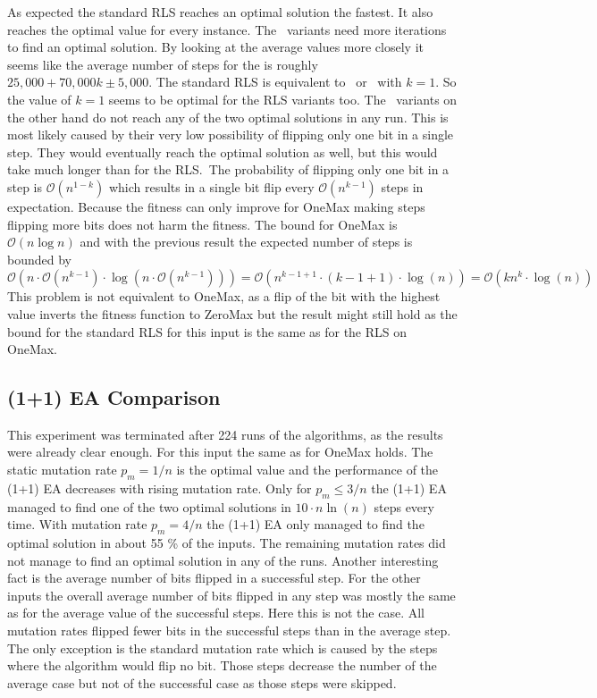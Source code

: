 As expected the standard RLS reaches an optimal solution the fastest.
It also reaches the optimal value for every instance.
The \RLSR~variants need more iterations to find an optimal solution.
By looking at the average values more closely it seems like the average number of steps for the \RLSR[k] is roughly $25,000 + 70,000k \pm 5,000$.
The standard RLS is equivalent to \RLSR~or \RLSN~with $k=1$.
So the value of $k=1$ seems to be optimal for the RLS variants too.
The \RLSN~variants on the other hand do not reach any of the two optimal solutions in any run.
This is most likely caused by their very low possibility of flipping only one bit in a single step.
They would eventually reach the optimal solution as well, but this would take much longer than for the RLS.\
The probability of flipping only one bit in a step is $\mathcal{O}(n^{1-k})$ which results in a single bit flip every $\mathcal{O}(n^{k-1})$ steps in expectation.
Because the fitness can only improve for OneMax making steps flipping more bits does not harm the fitness.
The bound for OneMax is $\mathcal{O}(n\log n)$ and with the previous result the expected number of steps is bounded by
$\mathcal{O}(n\cdot\mathcal{O}(n^{k-1})\cdot \log(n\cdot\mathcal{O}(n^{k-1}))) 
=\mathcal{O}(n^{k-1+1}\cdot (k-1+1)\cdot\log(n))
=\mathcal{O}(kn^{k}\cdot\log(n))$
This problem is not equivalent to OneMax, as a flip of the bit with the highest value inverts the fitness function to ZeroMax but the result might still hold as the bound for the standard RLS for this input is the same as for the RLS on OneMax.
\subsection{(1+1) EA Comparison}




This experiment was terminated after 224 runs of the algorithms, as the results were already clear enough.
For this input the same as for OneMax holds. 
The static mutation rate $p_m=1/n$ is the optimal value and the performance of the (1+1) EA decreases with rising mutation rate.
Only for $p_m\le3/n$ the (1+1) EA managed to find one of the two optimal solutions in $10 \cdot n\ln(n)$ steps every time.
With mutation rate $p_m=4/n$ the (1+1) EA only managed to find the optimal solution in about 55 \% of the inputs.
The remaining mutation rates did not manage to find an optimal solution in any of the runs.
Another interesting fact is the average number of bits flipped in a successful step.
For the other inputs the overall average number of bits flipped in any step was mostly the same as for the average value of the successful steps. Here this is not the case.
All mutation rates flipped fewer bits in the successful steps than in the average step.
The only exception is the standard mutation rate which is caused by the steps where the algorithm would flip no bit.
Those steps decrease the number of the average case but not of the successful case as those steps were skipped.
